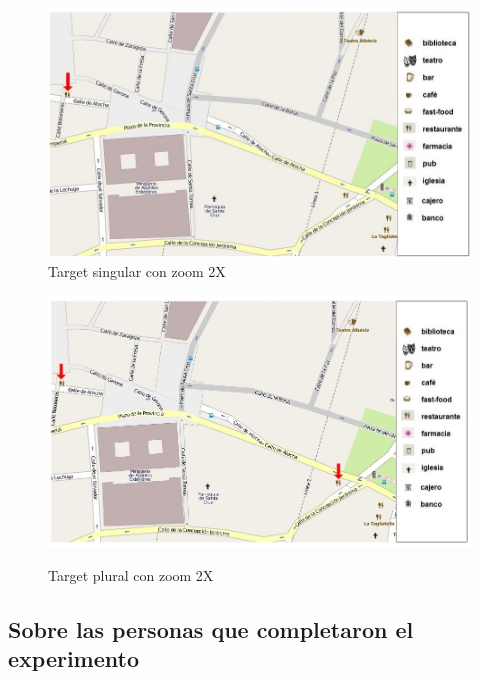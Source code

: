 \begin{figure}
\begin{minipage}[b]{0.5\linewidth}
\centering
\includegraphics[width=\textwidth]{figures/rest-singular2x.png}\\[0pt]
\caption{Target singular con zoom 2X}
\label{rest-singular2x}
\end{minipage}
\vspace*{.1cm}
\begin{minipage}[b]{0.5\linewidth}
\centering
\includegraphics[width=\textwidth]{figures/rest-plural2x.png}\\[0pt]
\caption{Target plural con zoom 2X}
\label{rest-plural2x}
\end{minipage}
\end{figure}



\subsection{Sobre las personas que completaron el experimento}
\label{corpus-voluntarios}

